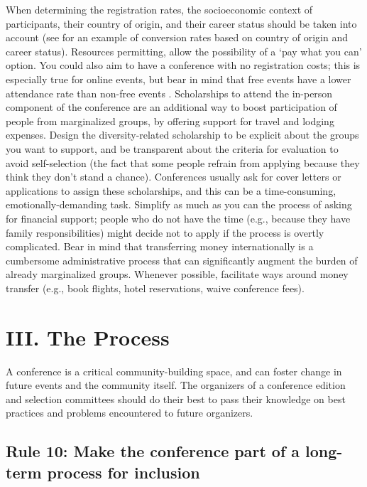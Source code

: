 \documentclass[10pt,letterpaper]{article}
\begin{document}
When determining the registration rates, the socioeconomic context of participants, their country of origin, and their career status should be taken into account  \cite{sarabipourChangingScientificMeetings2021, andalibPostdocQueueLabour2018, kaplanPostdocNot2012}
(see \cite{canelon2021cost} for an example of conversion rates based on country of origin and career status). 
Resources permitting, allow the possibility of a `pay what you can' option. You could also aim to have a conference with no registration costs; this is especially true for online events, but bear in mind that free events have a lower attendance rate than non-free events \cite{eventbrite_ultimate_2017}. 
Scholarships to attend the in-person component of the conference are an additional way to boost participation of people from marginalized groups, by offering support for travel and lodging expenses.
Design the diversity-related scholarship to be explicit about the groups you want to support, and be transparent about the criteria for evaluation to avoid self-selection (the fact that some people refrain from applying because they think they don't stand a chance). 
Conferences usually ask for cover letters or applications to assign these scholarships, and this can be a time-consuming, emotionally-demanding task. 
Simplify as much as you can the process of asking for financial support; 
people who do not have the time (e.g., because they have family responsibilities) might decide not to apply if the process is overtly complicated. 
Bear in mind that transferring money internationally is a cumbersome administrative process that can significantly augment the burden of already marginalized groups. Whenever possible, facilitate ways around money transfer (e.g., book flights, hotel reservations, waive conference fees).



\section*{III. The Process}

A conference is a critical community-building space, and can foster change in future events and the community itself. The organizers of a conference edition and selection committees should do their best to pass their knowledge on best practices and problems encountered to future organizers.


\subsection*{Rule 10: Make the conference part of a long-term process for inclusion}
\label{rule_process}
\end{document}
